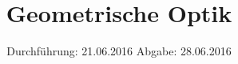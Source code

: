 
\subject{408}
\title{Geometrische Optik}
\date{
  Durchführung: 21.06.2016
  \hspace{3em}
  Abgabe: 28.06.2016
}



\maketitle
\newpage
\mbox{}
\newpage
\thispagestyle{empty}
\tableofcontents
\newpage






\nocite{numpy}
\nocite{matplotlib}
\nocite{uncertainties}
\printbibliography


